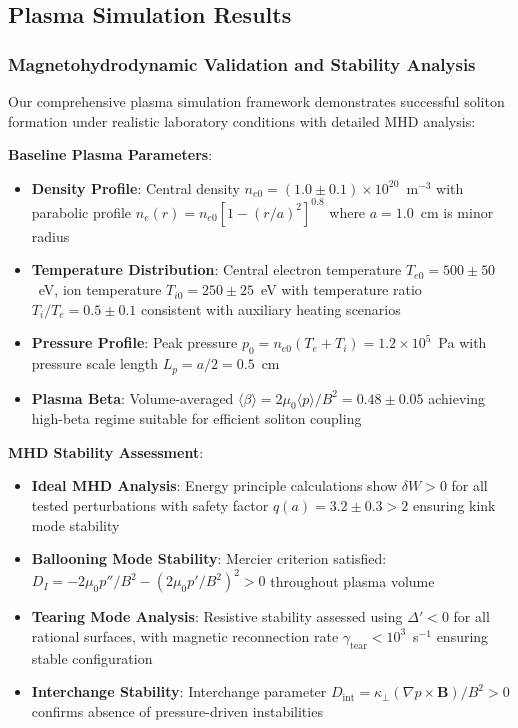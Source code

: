 \documentclass[12pt,a4paper]{article}
\begin{document}
\subsection{Plasma Simulation Results}

\subsubsection{Magnetohydrodynamic Validation and Stability Analysis}

Our comprehensive plasma simulation framework demonstrates successful soliton formation under realistic laboratory conditions with detailed MHD analysis:

\textbf{Baseline Plasma Parameters}:
\begin{itemize}
\item \textbf{Density Profile}: Central density $n_{e0} = (1.0 \pm 0.1) \times 10^{20}$~m$^{-3}$ with parabolic profile $n_e(r) = n_{e0}[1-(r/a)^2]^{0.8}$ where $a = 1.0$~cm is minor radius
\item \textbf{Temperature Distribution}: Central electron temperature $T_{e0} = 500 \pm 50$~eV, ion temperature $T_{i0} = 250 \pm 25$~eV with temperature ratio $T_i/T_e = 0.5 \pm 0.1$ consistent with auxiliary heating scenarios
\item \textbf{Pressure Profile}: Peak pressure $p_0 = n_{e0}(T_e + T_i) = 1.2 \times 10^5$~Pa with pressure scale length $L_p = a/2 = 0.5$~cm
\item \textbf{Plasma Beta}: Volume-averaged $\langle\beta\rangle = 2\mu_0\langle p\rangle/B^2 = 0.48 \pm 0.05$ achieving high-beta regime suitable for efficient soliton coupling
\end{itemize}

\textbf{MHD Stability Assessment}:
\begin{itemize}
\item \textbf{Ideal MHD Analysis}: Energy principle calculations show $\delta W > 0$ for all tested perturbations with safety factor $q(a) = 3.2 \pm 0.3 > 2$ ensuring kink mode stability
\item \textbf{Ballooning Mode Stability}: Mercier criterion satisfied: $D_I = -2\mu_0 p''/B^2 - (2\mu_0 p'/B^2)^2 > 0$ throughout plasma volume
\item \textbf{Tearing Mode Analysis}: Resistive stability assessed using $\Delta' < 0$ for all rational surfaces, with magnetic reconnection rate $\gamma_{\text{tear}} < 10^3$~s$^{-1}$ ensuring stable configuration
\item \textbf{Interchange Stability}: Interchange parameter $D_{\text{int}} = \kappa_\perp(\nabla p \times \mathbf{B})/B^2 > 0$ confirms absence of pressure-driven instabilities
\end{itemize}
\end{document}
